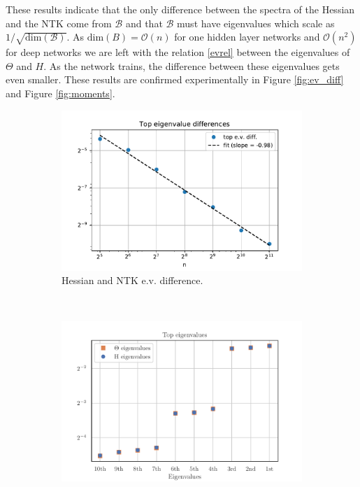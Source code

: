 \documentclass[english]{article}
\begin{document}
These results indicate that the only difference between the spectra of the Hessian and the NTK come from $\mathcal{B}$ and that $\mathcal{B}$ must have eigenvalues which scale as $1/\sqrt{\textrm{dim}(\mathcal{B})}$. As $\textrm{dim}(B)=\mathcal{O}(n)$ for one hidden layer networks and $\mathcal{O}(n^{2})$ for deep networks we are left with the relation \eqref{evrel} between the eigenvalues of $\Theta$ and $H$. As the network trains, the difference between these eigenvalues gets even smaller. 
These results are confirmed experimentally in Figure \ref{fig:ev_diff} and Figure \ref{fig:moments}.
  \begin{figure}
     \centering
     \begin{subfigure}[b]{0.46\textwidth}
         \centering
         \includegraphics[width=\textwidth]{new_figs/ev_diff}
         \caption{Hessian and NTK e.v. difference.}
         \label{fig:top_ev_diff}
     \end{subfigure}
 \ \ \ \ \ \ \ \ \ \ 
     \begin{subfigure}[b]{0.46\textwidth}
         \centering
         \includegraphics[width=\textwidth]{new_figs/top_evs}

\end{subfigure}
\end{figure}
\end{document}
